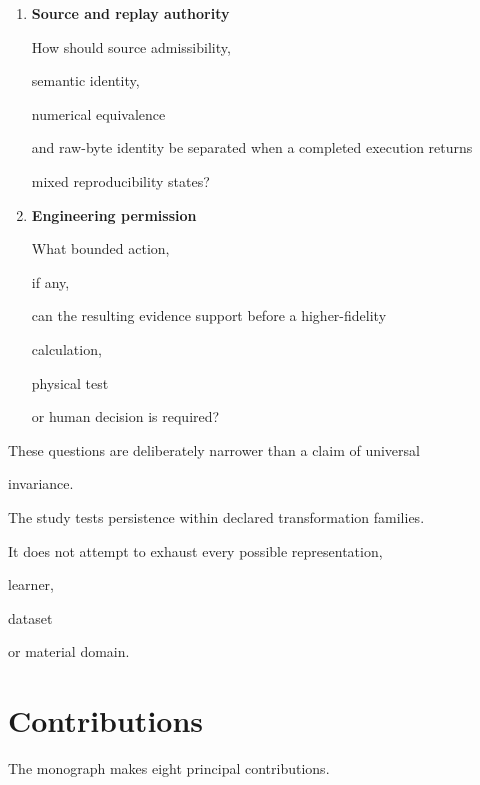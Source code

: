 \documentclass[11pt,a4paper,oneside]{report}
\begin{document}
\begin{enumerate}
\item

\textbf{Source and replay authority}



How should source admissibility,

semantic identity,

numerical equivalence

and raw-byte identity be separated when a completed execution returns

mixed reproducibility states?



\item

\textbf{Engineering permission}



What bounded action,

if any,

can the resulting evidence support before a higher-fidelity

calculation,

physical test

or human decision is required?



\end{enumerate}



These questions are deliberately narrower than a claim of universal

invariance.



The study tests persistence within declared transformation families.



It does not attempt to exhaust every possible representation,

learner,

dataset

or material domain.



\section{Contributions}



The monograph makes eight principal contributions.
\end{document}
